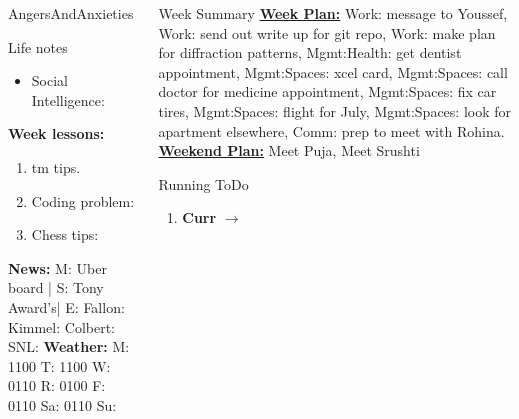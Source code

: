 \begin{columns}
\begin{column}{0.20\linewidth}
\begin{block}{AngersAndAnxieties}
\begin{itemize}
      \end{itemize}
    \end{block}
      \begin{block}{Life notes}
        \begin{itemize}
          \tiny \item \tiny Social Intelligence: 
        \end{itemize}
      \end{block}
      \begin{block}
        {\tiny {\bf Week lessons:}}
        \begin{enumerate}
        \item \tiny tm tips.
        \item \tiny Coding problem: 
        \item \tiny Chess tips: 
        \end{enumerate}
            {{\tiny {\tiny \bf  News:}} {\tiny  M: Uber board | S:
                Tony Award's| E: Fallon:  Kimmel:  Colbert: SNL:}}
            {{\tiny {\tiny \bf  Weather:}} {\tiny M: 1100 T: 1100 W:
                0110 R: 0100 F: 0110 Sa: 0110 Su: }}
      \end{block}
  \end{column}
  \begin{column}{0.6\linewidth}
    \begin{block}{Week Summary} 
      {\underline {\bf Week Plan:} 
        Work: message to Youssef,
        Work: send out write up for git repo, Work: make plan for diffraction patterns, 
        Mgmt:Health: get dentist appointment, Mgmt:Spaces: xcel card, Mgmt:Spaces: call doctor for medicine appointment, Mgmt:Spaces: fix car tires, 
        Mgmt:Spaces: flight for July,  Mgmt:Spaces: look for apartment elsewhere, Comm: prep to meet with Rohina.} \\
      {\underline{\bf Weekend Plan:} Meet Puja, Meet Srushti }\\
    \end{block} 

      \begin{block}{Running ToDo} %
        \begin{enumerate} 
<<<<<<< HEAD
        \tiny \item \tiny \textbf{Curr} $\rightarrow$ 


\end{enumerate}
\end{block}
\end{column}
\end{columns}
